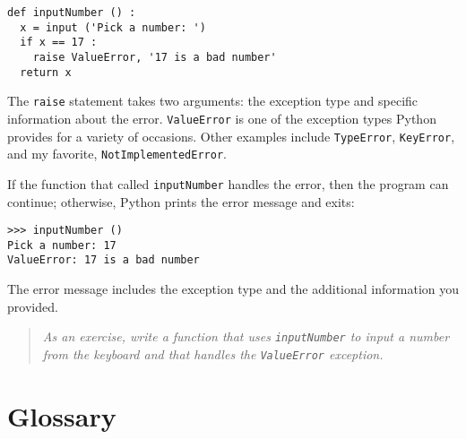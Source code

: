 \beforeverb
\begin{verbatim}
def inputNumber () :
  x = input ('Pick a number: ')
  if x == 17 :
    raise ValueError, '17 is a bad number'
  return x
\end{verbatim}
\afterverb
%
The {\tt raise} statement takes two arguments: the exception type and
specific information about the error.  {\tt ValueError} is one of the
exception types Python provides for a variety of occasions.  Other
examples include {\tt TypeError}, {\tt KeyError}, and my favorite,
{\tt NotImplementedError}.

If the function that called {\tt inputNumber} handles the error,
then the program can continue; otherwise, Python prints the
error message and exits:

\beforeverb
\begin{verbatim}
>>> inputNumber ()
Pick a number: 17
ValueError: 17 is a bad number
\end{verbatim}
\afterverb
%
The error message includes the exception type and the
additional information you provided.

\begin{quote}
{\em As an exercise, write a function that uses {\tt inputNumber}
to input a number from the keyboard and that handles the
{\tt ValueError} exception.}
\end{quote}


\section{Glossary}


